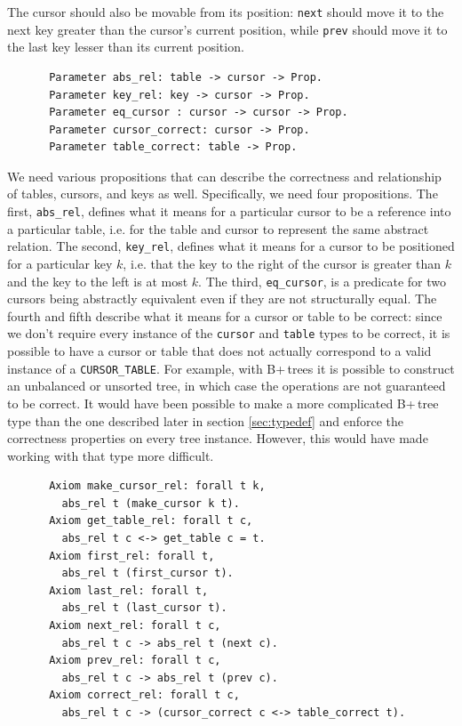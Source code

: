 \documentclass[a4paper,12pt]{article}
\begin{document}
The cursor should also be movable from its position: \texttt{next} should move it to the next key greater than the cursor’s current position, while \texttt{prev} should move it to the last key lesser than its current position.

\begin{figure}[h]
\begin{singlespace}
\begin{verbatim}
 Parameter abs_rel: table -> cursor -> Prop.
 Parameter key_rel: key -> cursor -> Prop.
 Parameter eq_cursor : cursor -> cursor -> Prop.
 Parameter cursor_correct: cursor -> Prop.
 Parameter table_correct: table -> Prop.
\end{verbatim}
\end{singlespace}
\end{figure}

We need various propositions that can describe the correctness and relationship of tables, cursors, and keys as well. Specifically, we need four propositions. The first, \texttt{abs\_rel}, defines what it means for a particular cursor to be a reference into a particular table, i.e. for the table and cursor to represent the same abstract relation. The second, \texttt{key\_rel}, defines what it means for a cursor to be positioned for a particular key $k$, i.e. that the key to the right of the cursor is greater than $k$ and the key to the left is at most $k$. The third, 
\texttt{eq\_cursor}, is a predicate for two cursors being abstractly equivalent even if they are not structurally equal. The fourth and fifth describe what it means for a cursor or table to be correct: since we don’t require every instance of the \texttt{cursor} and \texttt{table} types to be correct, it is possible to have a cursor or table that does not actually correspond to a valid instance of a \texttt{CURSOR\_TABLE}. For example, with B+\,trees it is possible to construct an unbalanced or unsorted tree, in which case the operations are not guaranteed to be correct. It would have been possible to make a more complicated B+\,tree type than the one described later in section \ref{sec:typedef} and enforce the correctness properties on every tree instance. However, this would have made working with that type more difficult.

\begin{figure}[h]
\begin{singlespace}
\begin{verbatim}
 Axiom make_cursor_rel: forall t k,
   abs_rel t (make_cursor k t).
 Axiom get_table_rel: forall t c,
   abs_rel t c <-> get_table c = t.
 Axiom first_rel: forall t,
   abs_rel t (first_cursor t).
 Axiom last_rel: forall t,
   abs_rel t (last_cursor t).
 Axiom next_rel: forall t c,
   abs_rel t c -> abs_rel t (next c).
 Axiom prev_rel: forall t c,
   abs_rel t c -> abs_rel t (prev c).
 Axiom correct_rel: forall t c,
   abs_rel t c -> (cursor_correct c <-> table_correct t).
\end{verbatim}
\end{singlespace}
\end{figure}
\end{document}
